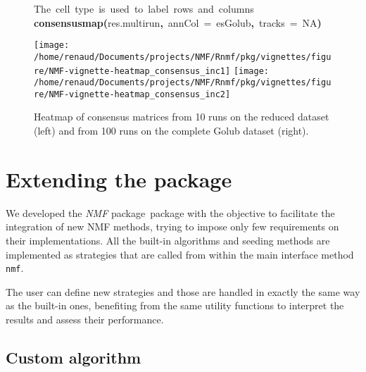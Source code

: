 \documentclass[a4paper]{article}\usepackage{graphicx, color}
\makeatletter
\newcommand{\hlnumber}[1]{\textcolor[rgb]{0,0,0}{#1}}%
\newcommand{\hlfunctioncall}[1]{\textcolor[rgb]{0.501960784313725,0,0.329411764705882}{\textbf{#1}}}%
\newcommand{\hlkeyword}[1]{\textcolor[rgb]{0,0,0}{\textbf{#1}}}%
\newcommand{\hlargument}[1]{\textcolor[rgb]{0.690196078431373,0.250980392156863,0.0196078431372549}{#1}}%
\newcommand{\hlcomment}[1]{\textcolor[rgb]{0.180392156862745,0.6,0.341176470588235}{#1}}%
\newcommand{\hlsymbol}[1]{\textcolor[rgb]{0,0,0}{#1}}%
\newcommand{\hlstd}[1]{\textcolor[rgb]{0,0,0}{#1}}%
\newenvironment{kframe}{%
 \def\FrameCommand##1{\hskip\@totalleftmargin \hskip-\fboxsep
 \colorbox{shadecolor}{##1}\hskip-\fboxsep
     \hskip-\linewidth \hskip-\@totalleftmargin \hskip\columnwidth}%
 \MakeFramed {\advance\hsize-\width
   \@totalleftmargin\z@ \linewidth\hsize
   \@setminipage}}%
 {\par\unskip\endMakeFramed}
\newenvironment{knitrout}{}{} %
\let\code=\texttt
\newcommand{\pkgname}[1]{\textit{#1}\xspace}
\newcommand{\Rpkg}[1]{\pkgname{#1} package\xspace}
\newcommand{\nmfpack}{\Rpkg{NMF}}
\makeatother
\begin{document}
\begin{figure}[ht]
\begin{knitrout}
\color{fgcolor}\begin{kframe}
\begin{flushleft}
\ttfamily\noindent
\hlcomment{\usebox{\hlnormalsizeboxhash}{\ }The{\ }cell{\ }type{\ }is{\ }used{\ }to{\ }label{\ }rows{\ }and{\ }columns}\hspace*{\fill}\\
\hlstd{}\hlfunctioncall{consensusmap}\hlkeyword{(}\hlsymbol{res.multirun}\hlkeyword{,}{\ }\hlargument{annCol}{\ }\hlargument{=}{\ }\hlsymbol{esGolub}\hlkeyword{,}{\ }\hlargument{tracks}{\ }\hlargument{=}{\ }\hlnumber{NA}\hlkeyword{)}\mbox{}
\normalfont
\end{flushleft}
\end{kframe}\texttt{[image: /home/renaud/Documents/projects/NMF/Rnmf/pkg/vignettes/figure/NMF-vignette-heatmap\_consensus\_inc1]} \texttt{[image: /home/renaud/Documents/projects/NMF/Rnmf/pkg/vignettes/figure/NMF-vignette-heatmap\_consensus\_inc2]} 
\end{knitrout}



\caption{Heatmap of consensus matrices from 10 runs on the reduced dataset
(left) and from 100 runs on the complete Golub dataset (right).}
\label{fig:heatmap_consensus}
\end{figure}
 
\section{Extending the package}

We developed the \nmfpack\ package with the objective to facilitate the integration of new NMF methods, trying to impose only few requirements on their implementations. 
All the built-in algorithms and seeding methods are implemented as strategies that are called from within the main interface method \code{nmf}. 

The user can define new strategies and those are handled in exactly the same way as the built-in ones, benefiting from the same utility functions to interpret the 
results and assess their performance. 

\subsection{Custom algorithm}
%
%
\end{document}
